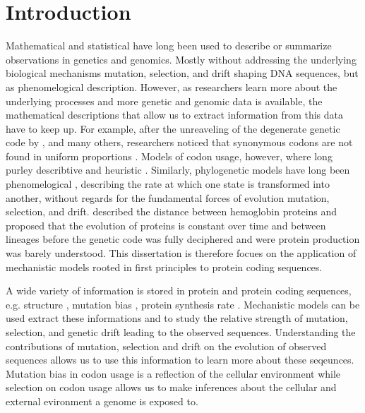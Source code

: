 \chapter{Introduction} 
\label{ch:introduction}

Mathematical and statistical have long been used to describe or summarize observations in genetics and genomics.
Mostly without addressing the underlying biological mechanisms mutation, selection, and drift shaping DNA sequences, but as phenomelogical description.
However, as researchers learn more about the underlying processes and more genetic and genomic data is available, the mathematical descriptions that allow us to extract information from this data have to keep up.
For example, after the unreaveling of the degenerate genetic code by \citet{MatthaeiAndNirenberg1961,NirenbergAndMatthaei1961,Maxwell1962,LederAndNirenberg1964}, and many others, researchers noticed that synonymous codons are not found in uniform proportions \citep{fitch1976,grantham1980,ikemura1981,grantham1981,sharp1988}.
Models of codon usage, however, where long purley describtive and heuristic \citep{ikemura1981,BennetzenAndHall1982,sharp1987,wright1990}.
Similarly, phylogenetic models have long been phenomelogical \citep{JukesAndCantor1969,Dayhoff1978,Kimura1980,felsenstein1981,Altschul1991}, describing the rate at which one state is transformed into another, without regards for the fundamental forces of evolution mutation, selection, and drift.
\citet{ZuckerkandlAndPauling1962} described the distance between hemoglobin proteins and proposed that the evolution of proteins is constant over time and between lineages before the genetic code was fully deciphered and were protein production was barely understood.
This dissertation is therefore focues on the application of mechanistic models rooted in first principles to protein coding sequences.

A wide variety of information is stored in protein and protein coding sequences, e.g. structure \citep{anfinsen1973}, mutation bias \citep{ShahAndGilchrist2011, gilchrist2015}, protein synthesis rate \citep{gilchrist2007,gilchrist2015}. 
Mechanistic models can be used extract these informations and to study the relative strength of mutation, selection, and genetic drift leading to the observed sequences.
Understanding the contributions of mutation, selection and drift on the evolution of observed sequences allows us to use this information to learn more about these seqeunces.
Mutation bias in codon usage is a reflection of the cellular environment while selection on codon usage allows us to make inferences about the cellular and external evironment a genome is exposed to.


